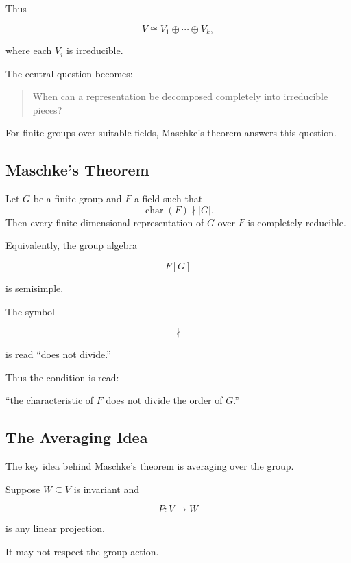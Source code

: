 Thus

\[ V\cong V_1\oplus\cdots\oplus V_k, \]

where each \(V_i\) is irreducible.

The central question becomes:

\begin{quote}
When can a representation be decomposed completely into irreducible pieces?
\end{quote}

For finite groups over suitable fields, Maschke's theorem answers this
question.

\subsection{Maschke's Theorem}
\label{subsec:maschkes-theorem}

\begin{theorem}
Let \(G\) be a finite group and \(F\) a field such that
\[ \operatorname{char}(F)\nmid |G|. \]
Then every finite-dimensional representation of \(G\) over \(F\) is
completely reducible.
\end{theorem}

Equivalently, the group algebra

\[ F[G] \]

is semisimple.

The symbol

\[ \nmid \]

is read ``does not divide.''

Thus the condition is read:

``the characteristic of \(F\) does not divide the order of \(G\).''

\subsection{The Averaging Idea}
\label{subsec:maschke-averaging}

The key idea behind Maschke's theorem is averaging over the group.

Suppose \(W\subseteq V\) is invariant and

\[ P:V\to W \]

is any linear projection.

It may not respect the group action.

